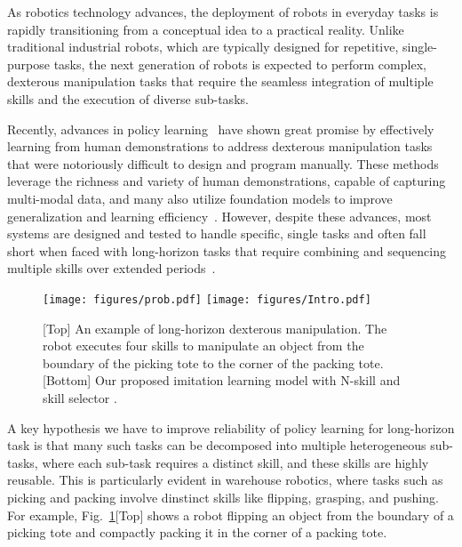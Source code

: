 As robotics technology advances, the deployment of robots in everyday tasks is rapidly transitioning from a conceptual idea to a practical reality. Unlike traditional industrial robots, which are typically designed for repetitive, single-purpose tasks, the next generation of robots is expected to perform complex, dexterous manipulation tasks that require the seamless integration of multiple skills and the execution of diverse sub-tasks.

Recently, advances in policy learning~\cite{chi2023diffusion, zhao2023learning, team2024octo} have shown great promise by effectively learning from human demonstrations to address dexterous manipulation tasks that were notoriously difficult to design and program manually. These methods leverage the richness and variety of human demonstrations, capable of capturing multi-modal data, and many also utilize foundation models to improve generalization and learning efficiency~\cite{open_x_embodiment_rt_x_2023, brohan2023rt1roboticstransformerrealworld, brohan2023rt2visionlanguageactionmodelstransfer, ze20243ddiffusionpolicygeneralizable, yang2024equibotsim3equivariantdiffusionpolicy}. However, despite these advances, most systems are designed and tested to handle specific, single tasks and often fall short when faced with long-horizon tasks that require combining and sequencing multiple skills over extended periods~\cite{mandlekar2021learninggeneralizelonghorizontasks, duan2017oneshotimitationlearning}.

\begin{figure}[t]
    \centering
    \texttt{[image: figures/prob.pdf]}
   \texttt{[image: figures/Intro.pdf]}
    \caption{[Top] An example of long-horizon dexterous manipulation. The robot executes four skills to manipulate an object from the boundary of the picking tote to the corner of the packing tote. [Bottom] Our proposed imitation learning model \ours with N-skill and skill selector \progss.}
    \label{fig:intro}
\end{figure}

A key hypothesis we have to improve reliability of policy learning for long-horizon task is that many such tasks can be decomposed into multiple heterogeneous sub-tasks, where each sub-task requires a distinct skill, and these skills are highly reusable. This is particularly evident in warehouse robotics, where tasks such as picking and packing involve dinstinct skills like flipping, grasping, and pushing. For example, Fig.~\ref{fig:intro}[Top] shows a robot flipping an object from the boundary of a picking tote and compactly packing it in the corner of a packing tote. %

